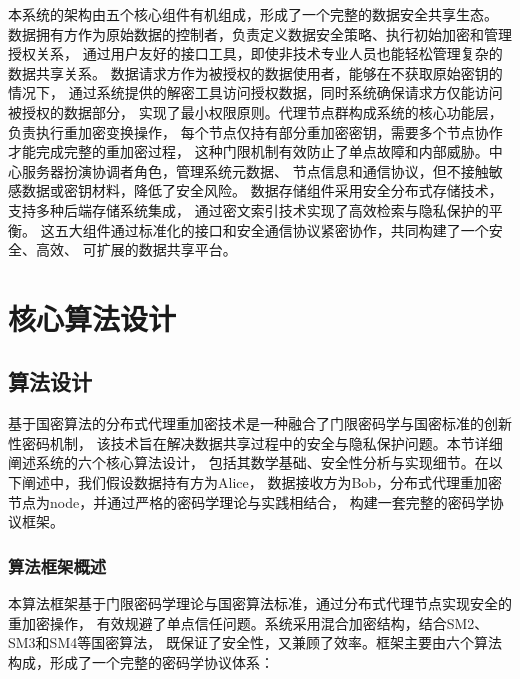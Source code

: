本系统的架构由五个核心组件有机组成，形成了一个完整的数据安全共享生态。
数据拥有方作为原始数据的控制者，负责定义数据安全策略、执行初始加密和管理授权关系，
通过用户友好的接口工具，即使非技术专业人员也能轻松管理复杂的数据共享关系。
数据请求方作为被授权的数据使用者，能够在不获取原始密钥的情况下，
通过系统提供的解密工具访问授权数据，同时系统确保请求方仅能访问被授权的数据部分，
实现了最小权限原则。代理节点群构成系统的核心功能层，负责执行重加密变换操作，
每个节点仅持有部分重加密密钥，需要多个节点协作才能完成完整的重加密过程，
这种门限机制有效防止了单点故障和内部威胁。中心服务器扮演协调者角色，管理系统元数据、
节点信息和通信协议，但不接触敏感数据或密钥材料，降低了安全风险。
数据存储组件采用安全分布式存储技术，支持多种后端存储系统集成，
通过密文索引技术实现了高效检索与隐私保护的平衡。
这五大组件通过标准化的接口和安全通信协议紧密协作，共同构建了一个安全、高效、
可扩展的数据共享平台。


\section{核心算法设计}
\subsection{算法设计}

基于国密算法的分布式代理重加密技术是一种融合了门限密码学与国密标准的创新性密码机制，
该技术旨在解决数据共享过程中的安全与隐私保护问题。本节详细阐述系统的六个核心算法设计，
包括其数学基础、安全性分析与实现细节。在以下阐述中，我们假设数据持有方为Alice，
数据接收方为Bob，分布式代理重加密节点为node，并通过严格的密码学理论与实践相结合，
构建一套完整的密码学协议框架。

\subsubsection{算法框架概述}

本算法框架基于门限密码学理论与国密算法标准，通过分布式代理节点实现安全的重加密操作，
有效规避了单点信任问题。系统采用混合加密结构，结合SM2、SM3和SM4等国密算法，
既保证了安全性，又兼顾了效率。框架主要由六个算法构成，形成了一个完整的密码学协议体系：

